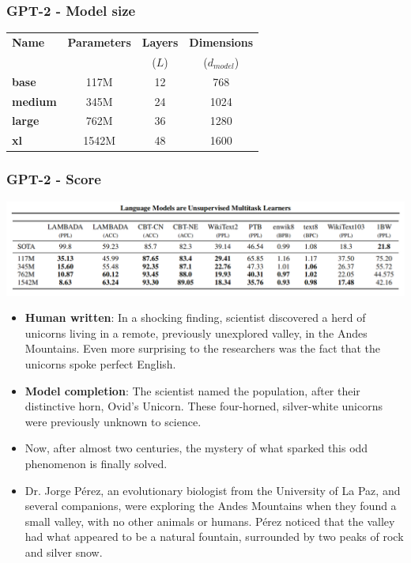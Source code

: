 \documentclass{beamer}
\begin{document}
\begin{frame}
    \frametitle{GPT-2 - Model size}
    \begin{center}
        \begin{tabular}{ l | c | c | c }
        \textbf{Name} & \textbf{Parameters} & \textbf{Layers} & \textbf{Dimensions}\\
        & & ($L$) & ($d_{model}$)\\
        \hline
        \textbf{base} & 117M & 12 & 768\\
        \textbf{medium} & 345M & 24 & 1024\\
        \textbf{large} & 762M & 36 & 1280\\
        \textbf{xl} & 1542M & 48 & 1600\\
        \end{tabular}
    \end{center}
\end{frame}

\begin{frame}
    \frametitle{GPT-2 - Score}
    \begin{center}
        \includegraphics[scale=1.0]{img/gpt2_score.png}
    \end{center}
\end{frame}

\begin{frame}
	\begin{itemize}
		\item[] \textbf{Human written}: In a shocking finding, scientist discovered a herd of unicorns living in a remote, previously unexplored valley, in the Andes Mountains. Even more surprising to the researchers was the fact that the unicorns spoke perfect English.
		\item[] \textbf{Model completion}: The scientist named the population, after their distinctive horn, Ovid’s Unicorn. These four-horned, silver-white unicorns were previously unknown to science.
		\item[] Now, after almost two centuries, the mystery of what sparked this odd phenomenon is finally solved.
		\item[] Dr. Jorge Pérez, an evolutionary biologist from the University of La Paz, and several companions, were exploring the Andes Mountains when they found a small valley, with no other animals or humans. Pérez noticed that the valley had what appeared to be a natural fountain, surrounded by two peaks of rock and silver snow.
	\end{itemize}
\end{frame}
\end{document}
